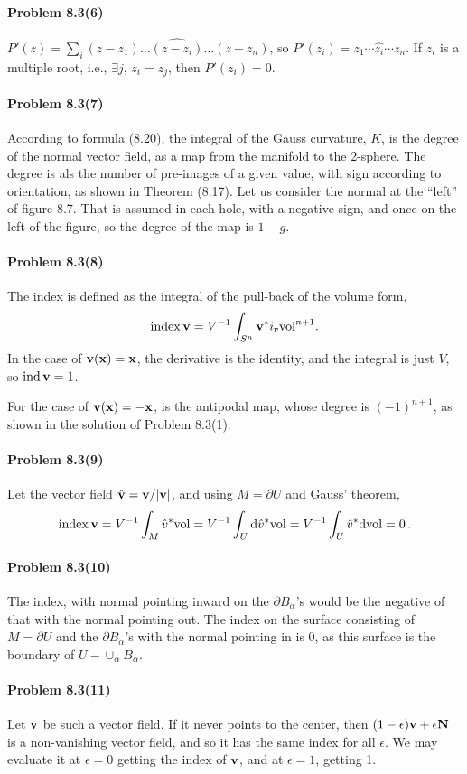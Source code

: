 \documentclass[a4paper,12pt]{article}
\def\d{\mathrm{d}}
\newcommand{\problem}[1]{\paragraph{Problem #1}}
\begin{document}
\problem{8.3(6)} $P'(z) = \sum_i (z-z_1)\dots \widehat{(z-z_i)}\dots (z-z_n)$, so $P'(z_i) = z_1\cdots \widehat{z_i}\cdots z_n$. If $z_i$ is a multiple root, i.e., $\exists j$, $z_i=z_j$, then $P'(z_i)=0$.


\problem{8.3(7)} According to formula (8.20), the integral of the Gauss curvature, $K$, is the degree of the normal vector field, as a map from the manifold to the 2-sphere. The degree is als the number of pre-images of a given value, with sign according to orientation, as shown in Theorem (8.17).  Let us consider the normal at the ``left'' of figure 8.7. That is assumed in each hole, with a negative sign, and once on the left of the figure, so the degree of the map is $1-g$.


\problem{8.3(8)} The index is defined as the integral of the pull-back of the volume form,
\[
 \mathop{\rm index}{\bf v} = V^{-1}\int_{S^n} {\bf v}^* i_{\bf r}{\rm vol}^{n+1}.
\]
In the case of ${\bf v}({\bf x}) = {\bf x}$, the derivative is the identity, and the integral is just $V$, so $\mathop{\rm ind}{\bf v} = 1$.

For the case of ${\bf v}({\bf x}) = -{\bf x}$, is the antipodal map, whose degree is $(-1)^{n+1}$, as shown in the solution of Problem 8.3(1).


\problem{8.3(9)} Let the vector field $\hat{\bf v} = {\bf v}/{|{\bf v}|}$, and using $M=\partial U$ and Gauss' theorem,
\[
 \mathop{\rm index}{\bf v} = V^{-1}\int_{M} \hat{v}{}^* {\rm vol} = V^{-1}\int_U \d \hat{v}{}^* {\rm vol} = V^{-1} \int_U \hat{v}{}^* \d{\rm vol} =0\,.
\]


\problem{8.3(10)} The index, with normal pointing inward on the $\partial B_\alpha$'s would be the negative of that with the normal pointing out. The index on the surface consisting of $M=\partial U$ and the $\partial B_\alpha$'s with the normal pointing in is 0, as this surface is the boundary of $U - \cup_\alpha B_\alpha$.


\problem{8.3(11)} Let ${\bf v}$ be such a vector field. If it never points to the center, then $(1-\epsilon){\bf v}+\epsilon {\bf N}$ is a non-vanishing vector field, and so it has the same index for all $\epsilon$. We may evaluate it at $\epsilon=0$ getting the index of ${\bf v}$, and at $\epsilon=1$, getting 1.
\end{document}
